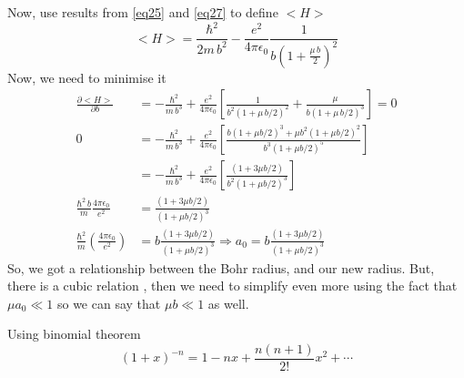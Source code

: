 \documentclass[12 pt]{article}
\numberwithin{equation}{section}
\begin{document}
Now, use results from \autoref{eq25} and \autoref{eq27} to define $\big<H\big>$
\begin{equation}\label{eq28}
  \big<H\big> = \frac{\hbar^2}{2m\,b^2} -\frac{e^2}{4\pi\epsilon_0}\frac{1}
  {b\left(1+\frac{\mu\,b}{2}\right)^2} 
\end{equation}
Now, we need to minimise it 
\begin{equation}\label{eq29}
  \begin{aligned}
    \frac{\partial \big<H\big>}{\partial b}  &= -\frac{\hbar^2}{m\,b^3}+\frac{e^2}{4\pi\epsilon_0}
  \left[\frac{1}{b^2(1+\mu\,b/2)^2} + \frac{\mu}{b\left(1+\mu\,b/2\right)^3}\right]=0\\
    0 &=-\frac{\hbar^2}{m\,b^3}+\frac{e^2}{4\pi\epsilon_0}\left[\frac{b(1+\mu b/2)^3 + \mu b^2 
  (1+\mu b/2)^2}{b^3(1+\mu b/2)^5} \right]\\
      &= -\frac{\hbar^2}{m\,b^3}+\frac{e^2}{4\pi\epsilon_0}\left[\frac{(1+3\mu b/2)}{b^2(1+\mu b
      /2)^3}\right]\\
        \frac{\hbar^2\,b}{m} \frac{4\pi\epsilon_0}{e^2}&= \frac{(1+3\mu b/2)}{(1+\mu b
      /2)^3}\\
          \frac{\hbar^2}{m}\left(\frac{4\pi\epsilon_0}{e^2}\right) &= b\frac{(1+3\mu b/2)}{(1+\mu b
            /2)^3}\Rightarrow \boxed{a_0 =  b\frac{(1+3\mu b/2)}{(1+\mu b
            /2)^3}}
  \end{aligned}
\end{equation}
So, we got a relationship between the Bohr radius, and our new radius. But, there is a cubic relation
, then we need to simplify even more using the fact that $\mu a_0 \ll 1$
so we can say that $\mu b\ll 1$ as well.

Using binomial theorem 
\begin{equation}\label{eq210}
  (1+x)^{-n} = 1 - nx + \frac{n(n+1)}{2!}x^2 + \cdots
\end{equation}
\end{document}
